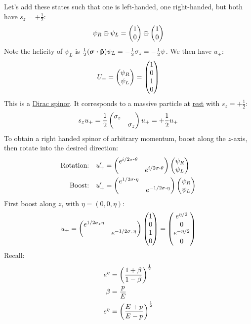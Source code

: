 Let's add these states such that one is left-handed, one right-handed, but both have $s_z=+\frac12$:
\begin{align*}
  \psi_R\oplus\psi_L=\pmqty{1\\0}\oplus\pmqty{1\\0}
\end{align*}
Note the helicity of $\psi_L$ is $\frac12(\bm{\sigma}\vdot\vu{p})\psi_L=-\frac12\sigma_z=-\frac12\psi$. We then have $u_+$:
\begin{align*}
  U_+=\pmqty{\psi_R\\\psi_L}=\pmqty{1\\0\\1\\0}
\end{align*}
This is a \underline{Dirac spinor}. It corresponds to a massive particle at \underline{rest} with $s_z=+\frac12$:
\begin{align*}
  s_zu_+=\frac12\pmqty{\sigma_z\\&\sigma_z}u_+=+\frac12 u_+
\end{align*}
To obtain a right handed spinor of arbitrary momentum, boost along the $z$-axis, then rotate into the desired direction:
\begin{align*}
  \text{Rotation:}&\quad u_+'=
  \pmqty{e^{i/2\sigma\vdot\theta}\\&e^{i/2\sigma\vdot\theta}}
  \pmqty{\psi_R\\\psi_L}\\
  \text{Boost:}&\quad u_+'=
  \pmqty{e^{1/2\sigma\vdot\eta}\\&e^{-1/2\sigma\vdot\eta}}
  \pmqty{\psi_R\\\psi_L}
\end{align*}
First boost along $z$, with $\eta=(0,0,\eta)$:
\begin{align*}
  u_+=\pmqty{e^{1/2\sigma_z\eta}\\&e^{-1/2\sigma_z\eta}}\pmqty{1\\0\\1\\0}
  =\pmqty{e^{\eta/2}\\0\\e^{-\eta/2}\\0}
\end{align*}
Recall:
\begin{align*}
  e^\eta&=\qty(\frac{1+\beta}{1-\beta})^{\frac12}\\
  \beta&=\frac{p}{E}\\
  e^\eta&=\qty(\frac{E+p}{E-p})^{\frac12}
\end{align*}
